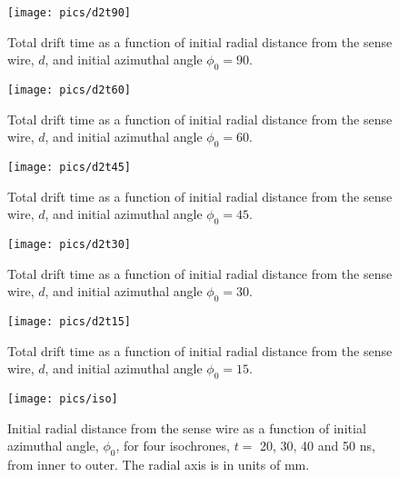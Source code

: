 \documentclass[twoside]{article}
\begin{document}
\begin{multicols}{2}
\begin{figure}[H]
\label{fig:d2t90}
    \texttt{[image: pics/d2t90]}
    \caption{Total drift time as a function of initial radial distance from the sense wire, $d$, and initial azimuthal angle $\phi_0 = 90$.}
\end{figure}
\begin{figure}[H]
\label{fig:d2t60}
    \texttt{[image: pics/d2t60]}
    \caption{Total drift time as a function of  initial radial distance from the sense wire, $d$, and initial azimuthal angle $\phi_0 = 60$.}
\end{figure}
\begin{figure}[H]
\label{fig:d2t45}
    \texttt{[image: pics/d2t45]}
    \caption{Total drift time as a function of  initial radial distance from the sense wire, $d$, and initial azimuthal angle $\phi_0 = 45$.}
\end{figure}
\begin{figure}[H]
\label{fig:d2t30}
    \texttt{[image: pics/d2t30]}
    \caption{Total drift time as a function of  initial radial distance from the sense wire, $d$, and initial azimuthal angle $\phi_0 = 30$.}
\end{figure}
\begin{figure}[H]
\label{fig:d2t15}
    \texttt{[image: pics/d2t15]}
    \caption{Total drift time as a function of  initial radial distance from the sense wire, $d$, and initial azimuthal angle $\phi_0 = 15$.}
\end{figure}




\begin{figure}[H]
\label{fig:iso}
    \texttt{[image: pics/iso]}
    \caption{Initial radial distance from the sense wire as a function of initial azimuthal angle, $\phi_0$, for four isochrones, $t=$ 20, 30, 40 and 50 ns, from inner to outer. The radial axis is in units of mm.}
\end{figure}



\end{multicols}
\end{document}
